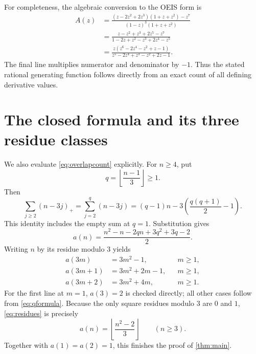 \documentclass[11pt,letterpaper]{article}
\numberwithin{equation}{section}
\theoremstyle{definition}
\theoremstyle{remark}
\newcommand{\GF}{A(z)}
\begin{document}
For completeness, the algebraic conversion to the OEIS form is
\begin{align*}
 \GF
 &=\frac{(z-2z^2+2z^3)(1+z+z^2)-z^7}
 {(1-z)^3(1+z+z^2)}\\
 &=\frac{z-z^2+z^3+2z^5-z^7}
 {1-2z+z^2-z^3+2z^4-z^5}\\
 &=\frac{z(z^6-2z^4-z^2+z-1)}
 {z^5-2z^4+z^3-z^2+2z-1}.
\end{align*}
The final line multiplies numerator and denominator by $-1$.
Thus the stated rational generating function follows directly from
an exact count of all defining derivative values.

\section{The closed formula and its three residue classes}
\label{sec:closed}
We also evaluate \eqref{eq:overlapcount} explicitly. For $n\ge4$, put
\[
 q=\left\lfloor\frac{n-1}{3}\right\rfloor\ge1.
\]
Then
\[
 \sum_{j\ge2}(n-3j)_+
 =\sum_{j=2}^{q}(n-3j)
 =(q-1)n-3\left(\frac{q(q+1)}2-1\right).
\]
This identity includes the empty sum at $q=1$.
Substitution gives
\begin{equation}\label{eq:qformula}
 a(n)=\frac{n^2-n-2qn+3q^2+3q-2}{2}.
\end{equation}
Writing $n$ by its residue modulo $3$ yields
\begin{equation}\label{eq:residues}
 \begin{aligned}
 a(3m)&=3m^2-1, &&m\ge1,\\
 a(3m+1)&=3m^2+2m-1, &&m\ge1,\\
 a(3m+2)&=3m^2+4m, &&m\ge1.
 \end{aligned}
\end{equation}
For the first line at $m=1$, $a(3)=2$ is checked directly;
all other cases follow from \eqref{eq:qformula}.
Because the only square residues modulo $3$ are $0$ and $1$,
\eqref{eq:residues} is precisely
\[
 a(n)=\left\lfloor\frac{n^2-2}{3}\right\rfloor\qquad(n\ge3).
\]
Together with $a(1)=a(2)=1$, this finishes the proof of
\cref{thm:main}.
\end{document}
